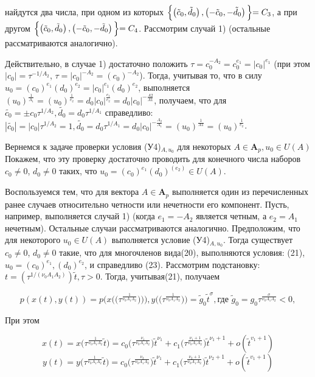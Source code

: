 \documentclass[11pt,reqno]{amsart}
\author{\MakeUppercase{В.Н.\,НЕФЁДОВ}}
\theoremstyle{plain}
\theoremstyle{definition}
\begin{document}
\Russian

найдутся два числа, при одном из которых $\Bigl\{\left({\tilde{c}}_0, {\tilde{d}}_0\right),\left({-\tilde{c}}_0, {-\tilde{d}}_0\right)\Bigl\} = C_3$, а при другом $\Bigl\{\left({\tilde{c}}_0, {\tilde{d}}_0\right),\left({-\tilde{c}}_0, {-\tilde{d}}_0\right)\Bigl\} = C_4$. Рассмотрим случай 1) (остальные рассматриваются аналогично).

Действительно, в случае 1) достаточно положить $\tau = c^{-A_2}_0 = c^{e_1}_0 = |c_0|^{e_1}$ (при этом $|c_0| = \tau^{-1/A_2}$, $\tau=|c_0|^{-A_2}=(c_0)^{-A_2}$). Тогда, учитывая то, что в силу $u_0 = (c_0)^{e_1}(d_0)^{e_2} = |c_0|^{e_1}(d_0)^{e_2}$, выполняется $(u_0)^{\frac{1}{A_1}} = (u_0)^\frac{1}{e_2} = d_0|c_0|^{\frac{e_1}{e_2}} = d_0|c_0|^{-\frac{A2}{A1}}$, получаем, что для $\tilde{c_0} = \pm c_0 \tau^{1/A_2}, \tilde{d_0} = d_0 \tau^{1/A_1}$ справедливо: $|\tilde{c_0}| = |c_0|\tau^{1/A_2} = 1, \tilde{d_0} = d_0\tau^{1/A_1} = d_0|c_0|^{-\frac{A_2}{A_1}} = (u_0)^{\frac{1}{A1}} = (u_0)^{\frac{1}{e_2}}$.

Вернемся к задаче проверки условия (У4)$_{A,u_0}$ для некоторых $A \in \mathbf{A}_p, u_0 \in U(A)$ Покажем, что эту проверку достаточно проводить для конечного числа наборов $c_0 \ne 0$, $d_0 \ne 0$ таких, что $u_0 = (c_0)^{e_1}(d_0)^(e_2) \in U(A)$.

Воспользуемся тем, что для вектора $A \in \mathbf{A}_p$ выполняется один из перечисленных
ранее случаев относительно четности или нечетности его компонент. Пусть, например,
выполняется случай 1) (когда $e_1 = -A_2$ является четным, а $e_2 = A_1$ нечетным). Остальные
случаи рассматриваются аналогично. Предположим, что для некоторого $u_0 \in U(A)$ выполняется условие (У4)$_{A,u_0}$. Тогда существует $c_0 \ne 0$, $d_0 \ne 0$ такие, что для многочленов вида(20), выполняются условия: (21), $u_0 = (c_0)^{e_1}, (d_0)^{e_2}$, и справедливо (23). 
Рассмотрим подстановку: $t = \left(\tau^{1/(\nu_0A_1A_2)}\right)\tilde{t}, \tau > 0$. Тогда, учитывая(21), получаем

$$p(x(t),y(t)) = p\bigg(x\bigg(\bigg( \tau^{\frac{1}{\nu_0A_1A_2}}\bigg)\bigg)\bigg), y\bigg(\bigg( \tau^{\frac{1}{\nu_0A_1A_2}}\bigg)\bigg) = \tilde{g}_0\tilde{t}^{\sigma}, \text{где } \tilde{g}_0 = g_0\tau^{\frac{\sigma}{\nu_0A_1A_2}} < 0,$$

При этом

$$x(t) = x\bigg( \tau^{\frac{1}{\nu_0A_1A_2}}\tilde{t}\bigg) = c_0\bigg( \tau^{\frac{\nu_1}{\nu_0A_1A_2}}\bigg)\tilde{t}^{\nu_1} + c_1\bigg( \tau^{\frac{\nu_1+1}{\nu_0A_1A_2}}\bigg)\tilde{t}^{\nu_1+1} + o(\tilde{t}^{v_1+1})$$
$$y(t) = y\bigg( \tau^{\frac{1}{\nu_0A_1A_2}}\tilde{t}\bigg) = c_0\bigg( \tau^{\frac{\nu_2}{\nu_0A_1A_2}}\bigg)\tilde{t}^{\nu_1} + c_1\bigg( \tau^{\frac{\nu_2+1}{\nu_0A_1A_2}}\bigg)\tilde{t}^{\nu_2+1} + o(\tilde{t}^{v_1+1})$$
\end{document}
